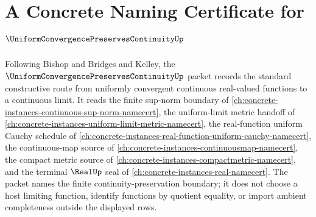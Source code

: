 \chapter{A Concrete Naming Certificate for $\UniformConvergencePreservesContinuityUp$}
\label{ch:concrete-instances-uniform-convergence-preserves-continuity-namecert}

Following Bishop and Bridges and Kelley, the $\UniformConvergencePreservesContinuityUp$ packet records the standard constructive route from uniformly convergent continuous real-valued functions to a continuous limit. It reads the finite sup-norm boundary of \autoref{ch:concrete-instances-continuous-sup-norm-namecert}, the uniform-limit metric handoff of \autoref{ch:concrete-instances-uniform-limit-metric-namecert}, the real-function uniform Cauchy schedule of \autoref{ch:concrete-instances-real-function-uniform-cauchy-namecert}, the continuous-map source of \autoref{ch:concrete-instances-continuousmap-namecert}, the compact metric source of \autoref{ch:concrete-instances-compactmetric-namecert}, and the terminal $\RealUp$ seal of \autoref{ch:concrete-instances-real-namecert}. The packet names the finite continuity-preservation boundary; it does not choose a host limiting function, identify functions by quotient equality, or import ambient completeness outside the displayed rows.


